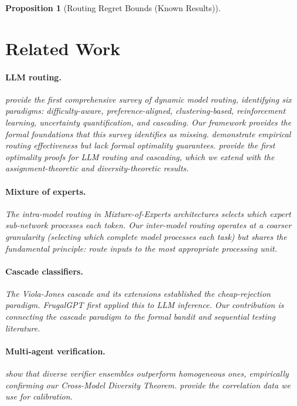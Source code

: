 \documentclass[11pt, a4paper, copyright]{googledeepmind}
\newtheorem{proposition}{Proposition}[section]
\begin{document}
\begin{proposition}[Routing Regret Bounds (Known Results)]
\section{Related Work}
\label{sec:related}

\paragraph{LLM routing.} \citet{moslemsurvey2026} provide the first comprehensive survey of dynamic model routing, identifying six paradigms: difficulty-aware, preference-aligned, clustering-based, reinforcement learning, uncertainty quantification, and cascading. Our framework provides the formal foundations that this survey identifies as missing. \citet{routellm2025} demonstrate empirical routing effectiveness but lack formal optimality guarantees. \citet{dekoninck2025cascade} provide the first optimality proofs for LLM routing and cascading, which we extend with the assignment-theoretic and diversity-theoretic results.

\paragraph{Mixture of experts.} The intra-model routing in Mixture-of-Experts architectures \citep{shazeer2017moe, fedus2022switch} selects which expert sub-network processes each token. Our inter-model routing operates at a coarser granularity (selecting which complete model processes each task) but shares the fundamental principle: route inputs to the most appropriate processing unit.

\paragraph{Cascade classifiers.} The Viola-Jones cascade \citep{violajones2001, violajones2004} and its extensions \citep{saberian2014} established the cheap-rejection paradigm. FrugalGPT \citep{frugalgpt2023} first applied this to LLM inference. Our contribution is connecting the cascade paradigm to the formal bandit and sequential testing literature.

\paragraph{Multi-agent verification.} \citet{lifshitz2025multiagent} show that diverse verifier ensembles outperform homogeneous ones, empirically confirming our Cross-Model Diversity Theorem. \citet{correlatedllm2025} provide the correlation data we use for calibration.


\end{proposition}
\end{document}
